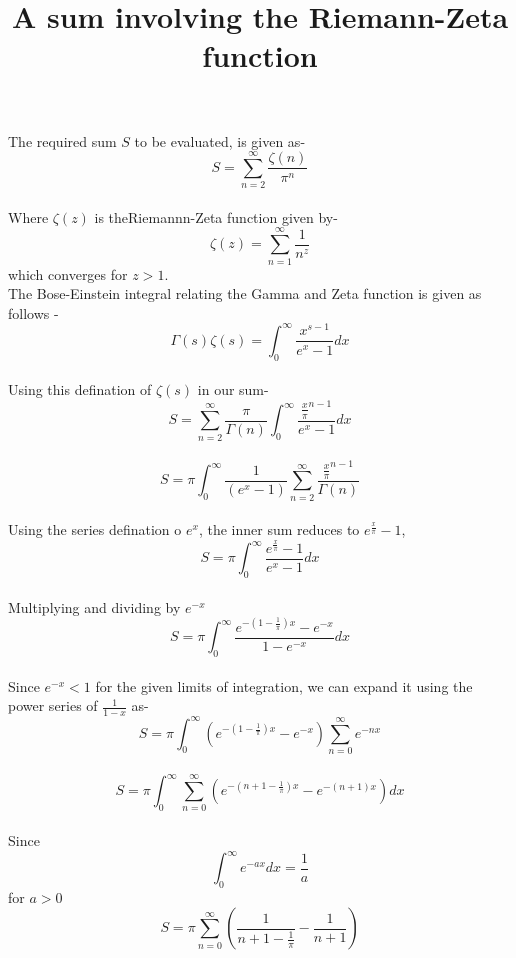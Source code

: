 \documentclass{article}
\title{A sum involving the Riemann-Zeta function }
\date{}
\begin{document}
\maketitle

\section*{}
The required sum $S$ to be evaluated, is given as-\\[10pt]
$$S=\sum_{n=2}^{\infty}\frac{\zeta(n)}{\pi^n}$$\\[10pt]
Where $\zeta(z)$ is theRiemannn-Zeta function given by-\\[10pt]
$$\zeta(z)=\sum_{n=1}^{\infty}\frac{1}{n^z}$$ which converges for $z>1$.\\[10pt]
The Bose-Einstein integral relating the Gamma and Zeta function is given as follows -\\[10pt]
$$\Gamma(s){\zeta(s)}=\int_{0}^{\infty}\frac{x^{s-1}}{e^x-1}dx$$\\[10pt]
Using this defination of $\zeta(s)$ in our sum-\\[10pt]
$$S=\sum_{n=2}^{\infty}\frac{\pi}{\Gamma(n)}\int_{0}^{\infty}\frac{{\frac{x}{\pi}}^{n-1}}{{e^x-1}}dx$$\\[10pt]
$$S={\pi}{}\int_{0}^{\infty}\frac{1}{({e^x-1})}\sum_{n=2}^{\infty}\frac{{\frac{x}{\pi}}^{n-1}}{\Gamma(n)}$$\\[10pt]
Using the series defination o $e^x$, the inner sum reduces to $e^{\frac{x}{\pi}}-1$, \\[10pt]
$$S=\pi\int_{0}^{\infty}\frac{e^{\frac{x}{\pi}}-1}{e^x-1}dx$$\\[10pt]
Multiplying and dividing by $e^{-x}$\\[10pt]
$$S=\pi\int_{0}^{\infty}\frac{e^{-(1-\frac{1}{\pi})x}-e^{-x}}{1-e^{-x}}dx$$\\[10pt]
Since $e^{-x} < 1 $ for the given limits of integration, we can expand it using the power series of $\frac{1}{1-x}$ as-\\[10pt]
$$S=\pi\int_{0}^{\infty}\left({e^{-(1-\frac{1}{\pi})x}-e^{-x}}\right)\sum_{n=0}^{\infty}e^{-nx}$$\\[10pt]
$$S=\pi\int_{0}^{\infty}\sum_{n=0}^{\infty}\left({e^{-(n+1-\frac{1}{\pi})x}-e^{-(n+1)x}}\right)dx$$\\[10pt]
Since\\[10pt]
$$\int_{0}^{\infty}e^{-ax}dx=\frac{1}{a}$$  for $a>0$\\[10pt]
$$S=\pi\sum_{n=0}^{\infty}\left(\frac{1}{n+1-\frac{1}{\pi}}-\frac{1}{n+1}\right)$$\\[10pt]
\end{document}
